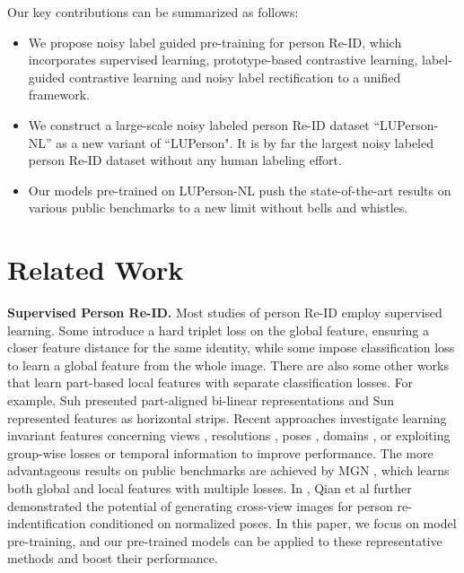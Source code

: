 \documentclass[10pt,twocolumn,letterpaper]{article}
\begin{document}
Our key contributions can be summarized as follows:\vspace{-0.6em}
\begin{itemize}[leftmargin=*]
\setlength\itemsep{-0.2em}

\item We propose noisy label guided pre-training for person Re-ID, which incorporates supervised learning, prototype-based contrastive learning, label-guided contrastive learning and noisy label rectification to a unified framework.
\item We construct a large-scale noisy labeled person Re-ID dataset ``LUPerson-NL'' as a new variant of ``LUPerson". It is by far the largest noisy labeled person Re-ID dataset without any human labeling effort.
\item Our models pre-trained on LUPerson-NL push the state-of-the-art results on various public benchmarks to a new limit without bells and whistles. 
\end{itemize}

\section{Related Work}
\label{sec:related}
\noindent\textbf{Supervised Person Re-ID.} 
Most studies of person Re-ID employ supervised learning. Some \cite{hermans2017defense,chen2017beyond,yuan2020defense} introduce a hard triplet loss on the global feature, ensuring a closer feature distance for the same identity, while some \cite{zheng2017person,shen2018person,zheng2017discriminatively} impose classification loss to learn a global feature from the whole image. There are also some other works that learn part-based local features with separate classification losses. For example, Suh \etal \cite{suh2018part} presented part-aligned bi-linear representations and Sun \etal \cite{sun2018PCB} represented features as horizontal strips.
Recent approaches investigate learning invariant features concerning views \cite{liu2019view}, resolutions \cite{li2019recover}, poses \cite{li2019cross}, domains \cite{huang2019sbsgan,jin2020style}, or exploiting group-wise losses \cite{luo2019spectral} or temporal information \cite{gu2019temporal,li2019global} to improve performance.
The more advantageous results on public benchmarks are achieved by MGN \cite{wang2018learning}, which learns both global and local features with multiple losses. In \cite{qian2018pose}, Qian et al further demonstrated the potential of generating cross-view images for person re-indentification conditioned on normalized poses. In this paper, we focus on model pre-training, and our pre-trained models can be applied to these representative methods and boost their performance.
\end{document}
